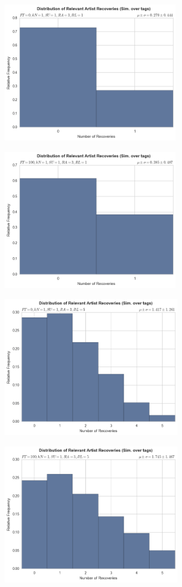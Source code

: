 \documentclass[12pt]{article}
\begin{document}
\begin{figure}[h!]
\centering
  \begin{subfigure}
      \centering
    \includegraphics[height=2.4in]{tags,FT=0,kN=1,SU=1,RA=3,RL=1.png}
  \end{subfigure}
  \begin{subfigure}
      \centering
    \includegraphics[height=2.4in]{tags,FT=100,kN=1,SU=1,RA=3,RL=1.png}
  \end{subfigure}
  \begin{subfigure}
      \centering
    \includegraphics[height=2.4in]{tags,FT=0,kN=1,SU=1,RA=3,RL=5.png}
  \end{subfigure}
  \begin{subfigure}
      \centering
    \includegraphics[height=2.4in]{tags,FT=100,kN=1,SU=1,RA=3,RL=5.png}

\end{subfigure}
\end{figure}
\end{document}
